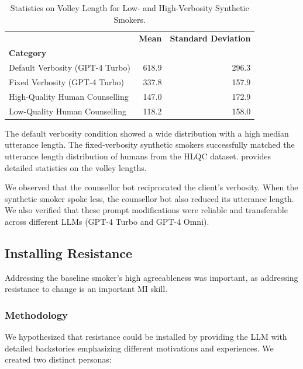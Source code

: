 \begin{table}[ht]
	\centering

	\begin{tabular}{lrr}
		\toprule
		{}                              & \textbf{Mean} & \textbf{Standard Deviation} \\
		\textbf{Category}               &               & {}                          \\
		\midrule
		Default Verbosity (GPT-4 Turbo) & 618.9         & 296.3                       \\
		Fixed Verbosity (GPT-4 Turbo)   & 337.8         & 157.9                       \\
		High-Quality Human Counselling  & 147.0         & 172.9                       \\
		Low-Quality Human Counselling   & 118.2         & 158.0                       \\
		\bottomrule
	\end{tabular}
	\caption[Statistics on Volley Length for Low- and High-Verbosity Synthetic Smokers]{Statistics on Volley Length for Low- and High-Verbosity Synthetic Smokers.}
	\label{tab:utterance_stats}
\end{table}

The default verbosity condition showed a wide distribution with a high median utterance length. The fixed-verbosity synthetic smokers successfully matched the utterance length distribution of humans from the HLQC dataset.  provides detailed statistics on the volley lengths.

We observed that the counsellor bot reciprocated the client's verbosity. When the synthetic smoker spoke less, the counsellor bot also reduced its utterance length. We also verified that these prompt modifications were reliable and transferable across different LLMs (GPT-4 Turbo and GPT-4 Omni).

\subsection{Installing Resistance}
\label{sec:synthetic-smoker-resistance}

Addressing the baseline smoker's high agreeableness was important, as addressing resistance to change is an important MI skill.

\subsubsection{Methodology}
We hypothesized that resistance could be installed by providing the LLM with detailed backstories emphasizing different motivations and experiences. We created two distinct personas:

